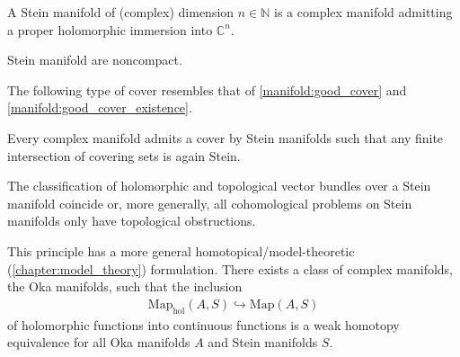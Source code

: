     \begin{adefinition}
        A Stein manifold of (complex) dimension $n\in\mathbb{N}$ is a complex manifold admitting a proper holomorphic immersion into $\mathbb{C}^n$.
    \end{adefinition}

    \begin{property}
        Stein manifold are noncompact.
    \end{property}

    The following type of cover resembles that of \cref{manifold:good_cover} and \cref{manifold:good_cover_existence}.
    \begin{property}
        Every complex manifold admits a cover by Stein manifolds such that any finite intersection of covering sets is again Stein.
    \end{property}

    \begin{property}
        The classification of holomorphic and topological vector bundles over a Stein manifold coincide or, more generally, all cohomological problems on Stein manifolds only have topological obstructions.
    \end{property}
    \begin{remark}
        This principle has a more general homotopical/model-theoretic (\cref{chapter:model_theory}) formulation. There exists a class of complex manifolds, the Oka manifolds, such that the inclusion
        \begin{gather}
            \mathrm{Map}_\text{hol}(A,S)\hookrightarrow\mathrm{Map}(A,S)
        \end{gather}
        of holomorphic functions into continuous functions is a weak homotopy equivalence for all Oka manifolds $A$ and Stein manifolds $S$.
    \end{remark}

